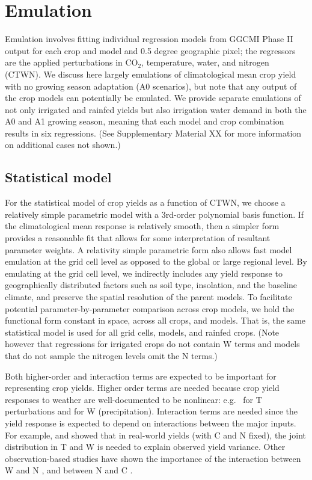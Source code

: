 \documentclass[gmd, manuscript]{copernicus} %
\begin{document}
\section{Emulation}
\label{S:3}
Emulation involves fitting individual regression models from GGCMI Phase II output for each crop and model and 0.5 degree geographic pixel; the regressors are the applied perturbations in CO$_2$, temperature, water, and nitrogen (CTWN). 
We discuss here largely emulations of climatological mean crop yield with no growing season adaptation (A0 scenarios), but note that any output of the crop models can potentially be emulated. 
We provide separate emulations of not only irrigated and rainfed yields but also irrigation water demand in both the A0 and A1 growing season, meaning that each model and crop combination results in six regressions. (See Supplementary Material XX for more information on additional cases not shown.)

\subsection{Statistical model} %
For the statistical model of crop yields as a function of CTWN, we choose a relatively simple parametric model with a 3rd-order polynomial basis function. 
If the climatological mean response is relatively smooth, then a simpler form provides a reasonable fit that allows for some interpretation of resultant parameter weights. 
A relativity simple parametric form also allows fast model emulation at the grid cell level as opposed to the global or large regional level. 
By emulating at the grid cell level, we indirectly includes any yield response to geographically distributed factors such as soil type, insolation, and the baseline climate, and preserve the spatial resolution of the parent models.
To facilitate potential parameter-by-parameter comparison across crop models, we hold the functional form constant in space, across all crops, and models. 
That is, the same statistical model is used for all grid cells, models, and rainfed crops. 
(Note however that regressions for irrigated crops do not contain W terms and models that do not sample the nitrogen levels omit the N terms.)

Both higher-order and interaction terms are expected to be important for representing crop yields. Higher order terms are needed because crop yield responses to weather are well-documented to be nonlinear: e.g.\ \citet{Schlenker2009} for T perturbations and \citet{He2016} for W (precipitation). 
Interaction terms are needed since the yield response is expected to depend on interactions between the major inputs. 
For example, \citet{Lobell2007} and \citet{Tebaldi2008} showed that in real-world yields (with C and N fixed), the joint distribution in T and W is needed to explain observed yield variance.  
Other observation-based studies have shown the importance of the interaction between W and N \citep[e.g.][]{AULAKH2005}, and between N and C \citep{Mitsuru92, Nakamura97}. 
\end{document}
